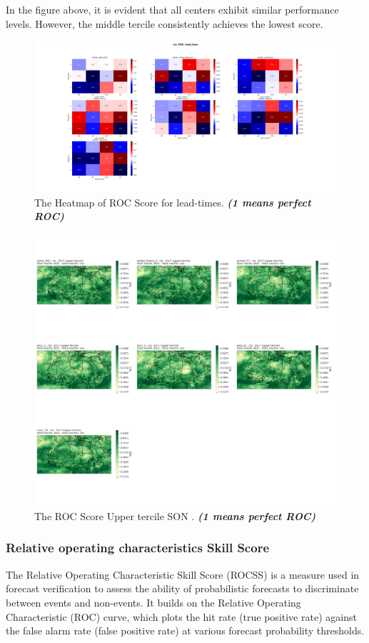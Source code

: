 In the figure above, it is evident that all centers exhibit similar performance levels. However, the middle tercile consistently achieves the lowest score.
\begin{figure}[H]
    \centering
    \includegraphics[scale=0.25]{roc_T2M_lead_time.png}
    \caption{The Heatmap of ROC Score for lead-times. \textbf{\textit{(1 means perfect ROC)}}}
\end{figure}


\begin{figure}[H]
    \centering
    \includegraphics[scale=0.3]{ROC_UPPER_SON.png}
    \caption{The ROC Score Upper tercile SON    . \textbf{\textit{(1 means perfect ROC)}}}
\end{figure}


\subsubsection{Relative operating characteristics Skill Score}
The Relative Operating Characteristic Skill Score (ROCSS) is a measure used in forecast verification to assess the ability of probabilistic forecasts to discriminate between events and non-events. It builds on the Relative Operating Characteristic (ROC) curve, which plots the hit rate (true positive rate) against the false alarm rate (false positive rate) at various forecast probability thresholds.

